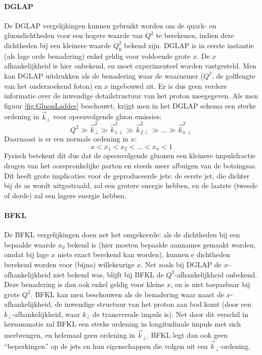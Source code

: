 \documentclass[a4paper,11pt]{article}
\numberwithin{equation}{section} %
\begin{document}
      \paragraph{DGLAP} \label{sec:DGLAP}
De DGLAP vergelijkingen kunnen gebruikt worden om de quark- en gluondichtheden voor een hogere waarde van $Q^2$ te berekenen, indien deze dichtheden bij een kleinere waarde $Q_0^2$ bekend zijn.
DGLAP is in eerste instantie (als lage orde benadering) enkel geldig voor voldoende grote $x$.
De $x$ afhankelijkheid is hier onbekend, en moet experimenteel worden vastgesteld.
Men kan DGLAP uitdrukken als de benadering waar de waarnemer ($Q^2$, de golflengte van het onderzoekend foton) en $x$ ingebouwd zit.
Er is dus geen verdere informatie over de inwendige detailstructuur van het proton meegegeven.
Als men figuur \ref{fig:GluonLadder} beschouwt, krijgt men in het DGLAP schema een sterke ordening in $\vec{k}_\perp$ voor opeenvolgende gluon emissies:
\begin{equation}
Q^2 \gg \vec{k}_\perp^2 \gg \vec{k}_{1\perp}^2 \gg \vec{k}_{2\perp}^2 \gg \hdots \gg \vec{k}_{n\perp}^2
\end{equation}
Daarnaast is er een normale ordening in $x$:
\begin{equation}
x < x_1 < x_2 < \hdots < x_n < 1
\end{equation}
Fysisch betekent dit dus dat de opeenvolgende gluonen een kleinere impulsfractie dragen van het oorspronkelijke parton en steeds meer afbuigen van de botsingsas.
Dit heeft grote implicaties voor de geproduceerde jets: de eerste jet, die dichter bij de as wordt uitgestraald, zal een grotere energie hebben, en de laatste (tweede of derde) zal een lagere energie hebben.

      \paragraph{BFKL}
De BFKL vergelijkingen doen net het omgekeerde: als de dichtheden bij een bepaalde waarde $x_0$ bekend is (hier moeten bepaalde aannames gemaakt worden, omdat bij lage $x$ niets exact berekend kan worden), kunnen e dichtheden berekend worden voor (bijna) willekeurige $x$.
Net zoals bij DGLAP de $x$-afhankelijkheid niet bekend was, blijft bij BFKL de $Q^2$-afhankelijkheid onbekend.
Deze benadering is dan ook enkel geldig voor kleine $x$, en is niet toepasbaar bij grote $Q^2$.
BFKL kan men beschouwen als de benadering waar naast de $x$-afhankelijkheid, de inwendige structuur van het proton aan bod komt (door een $k_\perp$-afhankelijkheid, waar $k_\perp$ de transversale impuls is).
Net door dit verschil in hersommatie zal BFKL een sterke ordening in longitudinale impuls met zich meebrengen, en helemaal geen ordening in $\vec{k}_\perp$.
BFKL legt dan ook geen “beperkingen” op de jets en hun eigenschappen die volgen uit een $\vec{k}_\perp$-ordening.
\end{document}
